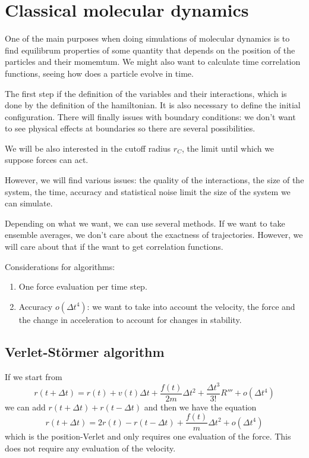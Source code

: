 \documentclass[palatino]{epflnotes}
\begin{document}
\section{Classical molecular dynamics}

One of the main purposes when doing simulations of molecular dynamics is to find equilibrum properties of some quantity that depends on the position of the particles and their momemtum. We might also want to calculate time correlation functions, seeing how does a particle evolve in time.

The first step if the definition of the variables and their interactions, which is done by the definition of the hamiltonian. It is also necessary to define the initial configuration. There will finally issues with boundary conditions: we don't want to see physical effects at boundaries so there are several possibilities.

We will be also interested in the cutoff radius $r_C$, the limit until which we suppose forces can act.

However, we will find various issues: the quality of the interactions, the size of the system, the time, accuracy and statistical noise limit the size of the system we can simulate.

Depending on what we want, we can use several methods. If we want to take ensemble averages, we don't care about the exactness of trajectories. However, we will care about that if the want to get correlation functions.

Considerations for algorithms:

\begin{enumerate}
	\item One force evaluation per time step.
	\item Accuracy $o(Δt^4)$: we want to take into account the velocity, the force and the change in acceleration to account for changes in stability.
\end{enumerate}

\subsection{Verlet-Störmer algorithm}

If we start from \[ r(t + Δt) = r(t) + v(t) Δt + \frac{f(t)}{2m}Δt^2 + \frac{Δt^3}{3!}R''' + o(Δt^4) \] we can add $r(t+Δt) + r(t-Δt)$ and then we have the equation \[ r(t + Δt) = 2r(t) - r(t - Δt) + \frac{f(t)}{m}Δt^2 + o(Δt^4) \] which is the position-Verlet and only requires one evaluation of the force. This does not require any evaluation of the velocity.
\end{document}
